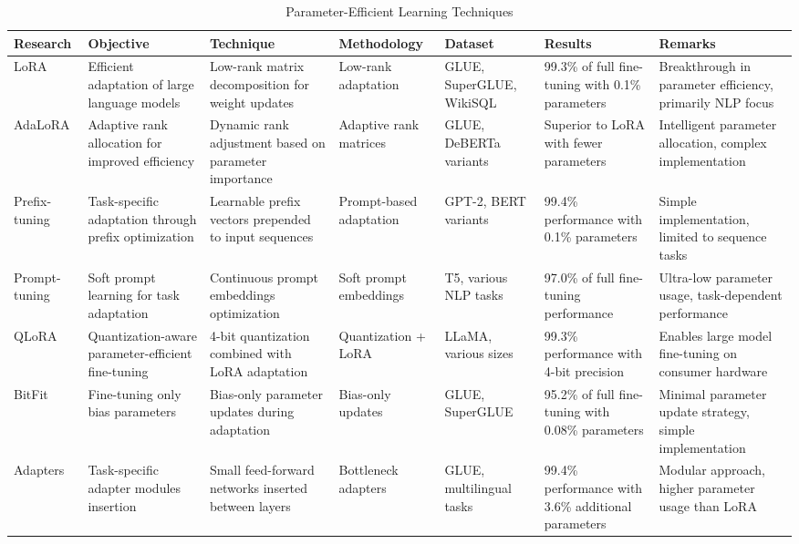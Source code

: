 \documentclass[12pt,a4paper]{report}
\begin{document}
\newpage
\begin{landscape}
\begin{table}[H]
\centering
\caption{Parameter-Efficient Learning Techniques}
\label{tab:parameter_efficient_techniques}
\small
\begin{tabular}{|p{3cm}|p{3.5cm}|p{3cm}|p{2.5cm}|p{2.5cm}|p{3cm}|p{3.5cm}|}
\hline
\textbf{Research} & \textbf{Objective} & \textbf{Technique} & \textbf{Methodology} & \textbf{Dataset} & \textbf{Results} & \textbf{Remarks} \\
\hline
LoRA \cite{hu2021lora} & Efficient adaptation of large language models & Low-rank matrix decomposition for weight updates & Low-rank adaptation & GLUE, SuperGLUE, WikiSQL & 99.3\% of full fine-tuning with 0.1\% parameters & Breakthrough in parameter efficiency, primarily NLP focus \\
\hline
AdaLoRA \cite{zhang2023adalora} & Adaptive rank allocation for improved efficiency & Dynamic rank adjustment based on parameter importance & Adaptive rank matrices & GLUE, DeBERTa variants & Superior to LoRA with fewer parameters & Intelligent parameter allocation, complex implementation \\
\hline
Prefix-tuning \cite{li2021prefix} & Task-specific adaptation through prefix optimization & Learnable prefix vectors prepended to input sequences & Prompt-based adaptation & GPT-2, BERT variants & 99.4\% performance with 0.1\% parameters & Simple implementation, limited to sequence tasks \\
\hline
Prompt-tuning \cite{lester2021power} & Soft prompt learning for task adaptation & Continuous prompt embeddings optimization & Soft prompt embeddings & T5, various NLP tasks & 97.0\% of full fine-tuning performance & Ultra-low parameter usage, task-dependent performance \\
\hline
QLoRA \cite{dettmers2023qlora} & Quantization-aware parameter-efficient fine-tuning & 4-bit quantization combined with LoRA adaptation & Quantization + LoRA & LLaMA, various sizes & 99.3\% performance with 4-bit precision & Enables large model fine-tuning on consumer hardware \\
\hline
BitFit \cite{zaken2021bitfit} & Fine-tuning only bias parameters & Bias-only parameter updates during adaptation & Bias-only updates & GLUE, SuperGLUE & 95.2\% of full fine-tuning with 0.08\% parameters & Minimal parameter update strategy, simple implementation \\
\hline
Adapters \cite{houlsby2019parameter} & Task-specific adapter modules insertion & Small feed-forward networks inserted between layers & Bottleneck adapters & GLUE, multilingual tasks & 99.4\% performance with 3.6\% additional parameters & Modular approach, higher parameter usage than LoRA \\
\hline
\end{tabular}
\end{table}
\end{landscape}
\end{document}
